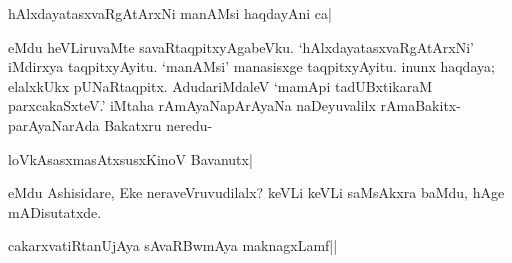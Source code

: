 \begin{shloka} 
hAlxdayatasxvaRgAtArxNi manAMsi haqdayAni ca| 
\end{shloka}

eMdu heVLiruvaMte savaRtaqpitxyAgabeVku. `hAlxdayatasxvaRgAtArxNi' iMdirxya taqpitxyAyitu. `manAMsi' manasisxge taqpitxyAyitu. inunx haqdaya; elalxkUkx pUNaRtaqpitx. AdudariMdaleV `mamApi tadUBxtikaraM parxcakaSxteV.'\label{193a} iMtaha rAmAyaNapArAyaNa naDeyuvalilx rAmaBakitx-parAyaNarAda Bakatxru neredu- 

\begin{shloka} 
loVkAsasxmasAtxsusxKinoV Bavanutx|\label{193b}
\end{shloka}
eMdu Ashisidare, Eke neraveVruvudilalx? keVLi keVLi saMsAkxra baMdu, hAge mADisutatxde. 

\begin{shloka} 
cakarxvatiRtanUjAya sAvaRBwmAya maknagxLamf||\label{193}
\end{shloka}
